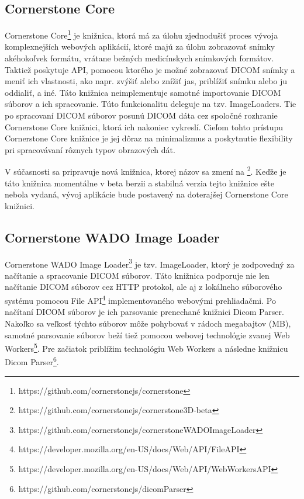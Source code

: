 \subsection {Cornerstone Core}
Cornerstone Core\footnote{https://github.com/cornerstonejs/cornerstone} je knižnica, ktorá má za úlohu zjednodušiť proces vývoja komplexnejších webových aplikácií, ktoré majú za úlohu zobrazovať snímky akéhokoľvek formátu, vrátane bežných medicínskych snímkových formátov. Taktiež poskytuje API, pomocou ktorého je možné zobrazovať DICOM snímky a meniť ich vlastnosti, ako napr. zvýšiť alebo znížiť jas, priblížiť snímku alebo ju oddialiť, a iné.
Táto knižnica neimplementuje samotné importovanie DICOM súborov a ich spracovanie. Túto funkcionalitu deleguje na tzv. ImageLoaders. Tie po spracovaní DICOM súborov posunú DICOM dáta cez spoločné rozhranie Cornerstone Core knižnici, ktorá ich nakoniec vykreslí. Cieľom tohto prístupu Cornerstone Core knižnice je jej dôraz na minimalizmus a poskytnutie flexibility pri spracovávaní rôznych typov obrazových dát.

V súčasnosti sa pripravuje nová  knižnica, ktorej názov sa zmení na \footnote{https://github.com/cornerstonejs/cornerstone3D-beta}. Keďže je táto knižnica momentálne v beta berzii a stabilná verzia tejto knižnice ešte nebola vydaná, vývoj aplikácie bude postavený na doterajšej Cornerstone Core knižnici.

\subsection {Cornerstone WADO Image Loader}
Cornerstone WADO Image Loader\footnote{https://github.com/cornerstonejs/cornerstoneWADOImageLoader} je tzv. ImageLoader, ktorý je zodpovedný za načítanie a spracovanie DICOM súborov. Táto knižnica podporuje nie len načítanie DICOM súborov cez HTTP protokol, ale aj z lokálneho súborového systému pomocou File API\footnote{https://developer.mozilla.org/en-US/docs/Web/API/File\textunderscore API} implementovaného webovými prehliadačmi. Po načítaní DICOM súborov je ich parsovanie prenechané knižnici Dicom Parser. Nakoľko sa veľkosť týchto súborov môže pohybovať v rádoch megabajtov (MB), samotné parsovanie súborov beží tiež pomocou webovej technológie zvanej Web Workers\footnote{https://developer.mozilla.org/en-US/docs/Web/API/Web\textunderscore Workers\textunderscore API}. Pre začiatok priblížim technológiu Web Workers a následne knižnicu Dicom Parser\footnote{https://github.com/cornerstonejs/dicomParser}.

